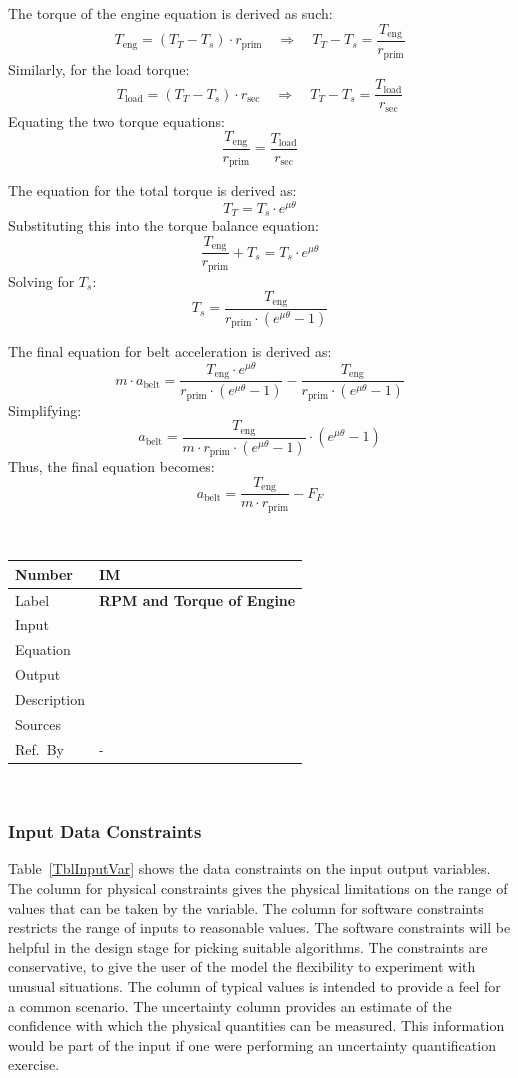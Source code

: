\documentclass[12pt]{article}
\newcommand{\colAwidth}{0.13\textwidth}
\newcommand{\colBwidth}{0.82\textwidth}
\newcounter{instnum} %
\newcommand{\definstance}[7] {
~\newline
\noindent
\begin{minipage}{\textwidth}
\renewcommand*{\arraystretch}{1.5}
\begin{tabular}{| p{\colAwidth} | p{\colBwidth}|}
  \hline
  \rowcolor[gray]{0.9}
  Number& IM\refstepcounter{instnum}\theinstnum \label{inst:\theinstnum}\\
  \hline
  Label& \bf #1 \\
  \hline
  Input& #2\\
  \hline
  Equation& #3\\
  \hline
  Output& #4\\
  \hline
  Description& #5 \\
  \hline
  Sources& #6 \\
  \hline
  Ref.\ By & #7\\
  \hline
\end{tabular}
\end{minipage}\\
}
\begin{document}
The torque of the engine equation is derived as such: \\
\[
T_{\text{eng}} = (T_T - T_s) \cdot r_{\text{prim}} \quad \Rightarrow \quad T_T - T_s = \frac{T_{\text{eng}}}{r_{\text{prim}}}
\]
Similarly, for the load torque: \\
\[
T_{\text{load}} = (T_T - T_s) \cdot r_{\text{sec}} \quad \Rightarrow \quad T_T - T_s = \frac{T_{\text{load}}}{r_{\text{sec}}}
\]
Equating the two torque equations: \\
\[
\frac{T_{\text{eng}}}{r_{\text{prim}}} = \frac{T_{\text{load}}}{r_{\text{sec}}}
\]
{\newline}

The equation for the total torque is derived as: \\
\[
T_T = T_s \cdot e^{\mu \theta}
\]
Substituting this into the torque balance equation: \\
\[
\frac{T_{\text{eng}}}{r_{\text{prim}}} + T_s = T_s \cdot e^{\mu \theta}
\]
Solving for \(T_s\): \\
\[
T_s = \frac{T_{\text{eng}}}{r_{\text{prim}} \cdot (e^{\mu \theta} - 1)}
\]
{\newline}

The final equation for belt acceleration is derived as: \\
\[
m \cdot a_{\text{belt}} = \frac{T_{\text{eng}} \cdot e^{\mu \theta}}{r_{\text{prim}} \cdot (e^{\mu \theta} - 1)} - \frac{T_{\text{eng}}}{r_{\text{prim}} \cdot (e^{\mu \theta} - 1)}
\]
Simplifying: \\
\[
a_{\text{belt}} = \frac{T_{\text{eng}}}{m \cdot r_{\text{prim}} \cdot (e^{\mu \theta} - 1)} \cdot (e^{\mu \theta} - 1)
\]
Thus, the final equation becomes: \\
\[
a_{\text{belt}} = \frac{T_{\text{eng}}}{m \cdot r_{\text{prim}}} - F_F
\]



\definstance
{RPM and Torque of Engine}
{} %
{} %
{} %
{} %
{} %
{-}

\subsubsection{Input Data Constraints} \label{sec_DataConstraints}    

Table~\ref{TblInputVar} shows the data constraints on the input output
variables.  The column for physical constraints gives the physical limitations
on the range of values that can be taken by the variable.  The column for
software constraints restricts the range of inputs to reasonable values.  The
software constraints will be helpful in the design stage for picking suitable
algorithms.  The constraints are conservative, to give the user of the model the
flexibility to experiment with unusual situations.  The column of typical values
is intended to provide a feel for a common scenario.  The uncertainty column
provides an estimate of the confidence with which the physical quantities can be
measured.  This information would be part of the input if one were performing an
uncertainty quantification exercise.
\end{document}
